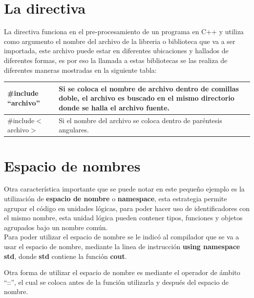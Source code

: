 \documentclass[a4paper,12pt,spanish]{article}
\begin{document}
\section{La directiva}
\label{sec:la-directiva}

La directiva funciona en el pre-procesamiento de un programa en C++ y
utiliza como argumento el nombre del archivo de la libreria o
biblioteca que va a ser importada, este archivo puede estar en
diferentes ubicaciones y hallados de diferentes formas, es por eso la
llamada a estas bibliotecas se las realiza de diferentes maneras
mostradas en la siguiente tabla:

\begin{table}[H]
  \centering
  \begin{tabular}[H]{|l| p{8cm}|}
    \hline
    \#include ``archivo'' & Si se coloca el nombre de archivo dentro
                            de comillas doble, el archivo es buscado
                            en el mismo directorio donde se halla el
                            archivo fuente.\\ \hline
    \#include$<$archivo$>$& Si el nombre del archivo se coloca dentro
                            de paréntesis angulares. \\ \hline
  \end{tabular}
\end{table}

\section{Espacio de nombres}
\label{sec:espacio-de-nombres}

Otra  característica importante que se puede notar en  este pequeño ejemplo
es la utilización de  \textbf{espacio de nombre} o \textbf{namespace}, esta
estrategia permite agrupar el código en unidades lógicas, para poder
hacer uso de identificadores con el mismo nombre, esta unidad lógica
pueden contener tipos, funciones y objetos agrupados bajo un nombre
común.\\


Para poder utilizar el espacio de nombre se le indicó al compilador
que se va a usar el espacio de nombre, mediante la linea de
instrucción \textbf{using namespace std}, donde \textbf{std} contiene la
función  \textbf{cout}.

Otra forma de utilizar el espacio de nombre es mediante el operador de
ámbito ``::'', el cual se coloca antes de la función utilizarla y
después del espacio de nombre. \\
\end{document}
